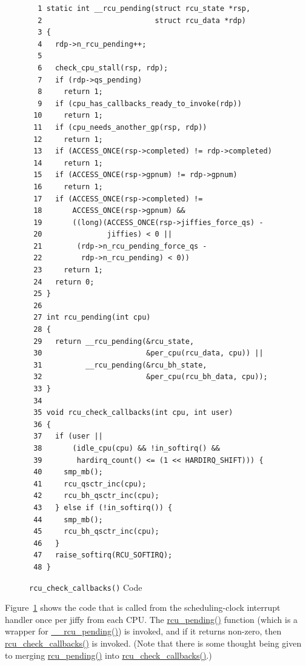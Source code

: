 \begin{figure}[tbp]
{ \scriptsize
\begin{verbatim}
  1 static int __rcu_pending(struct rcu_state *rsp,
  2                          struct rcu_data *rdp)
  3 {
  4   rdp->n_rcu_pending++;
  5 
  6   check_cpu_stall(rsp, rdp);
  7   if (rdp->qs_pending)
  8     return 1;
  9   if (cpu_has_callbacks_ready_to_invoke(rdp))
 10     return 1;
 11   if (cpu_needs_another_gp(rsp, rdp))
 12     return 1;
 13   if (ACCESS_ONCE(rsp->completed) != rdp->completed)
 14     return 1;
 15   if (ACCESS_ONCE(rsp->gpnum) != rdp->gpnum)
 16     return 1;
 17   if (ACCESS_ONCE(rsp->completed) !=
 18       ACCESS_ONCE(rsp->gpnum) &&
 19       ((long)(ACCESS_ONCE(rsp->jiffies_force_qs) -
 20               jiffies) < 0 ||
 21        (rdp->n_rcu_pending_force_qs -
 22         rdp->n_rcu_pending) < 0))
 23     return 1;
 24   return 0;
 25 }
 26 
 27 int rcu_pending(int cpu)
 28 {
 29   return __rcu_pending(&rcu_state,
 30                        &per_cpu(rcu_data, cpu)) ||
 31          __rcu_pending(&rcu_bh_state,
 32                        &per_cpu(rcu_bh_data, cpu));
 33 }
 34 
 35 void rcu_check_callbacks(int cpu, int user)
 36 {
 37   if (user ||
 38       (idle_cpu(cpu) && !in_softirq() &&
 39        hardirq_count() <= (1 << HARDIRQ_SHIFT))) {
 40     smp_mb();
 41     rcu_qsctr_inc(cpu);
 42     rcu_bh_qsctr_inc(cpu);
 43   } else if (!in_softirq()) {
 44     smp_mb();
 45     rcu_bh_qsctr_inc(cpu);
 46   }
 47   raise_softirq(RCU_SOFTIRQ);
 48 }
\end{verbatim}
}
\caption{{\tt rcu\_check\_callbacks()} Code}
\label{fig:app:rcuimpl:rcutreewt:Code for rcutree rcu-check-callbacks}
\end{figure}

Figure~\ref{fig:app:rcuimpl:rcutreewt:Code for rcutree rcu-check-callbacks}
shows the code that is called from the scheduling-clock interrupt
handler once per jiffy from each CPU.
The \url{rcu_pending()} function (which is a wrapper for \url{__rcu_pending()})
is invoked, and if it returns non-zero, then \url{rcu_check_callbacks()}
is invoked.
(Note that there is some thought being given to merging \url{rcu_pending()}
into \url{rcu_check_callbacks()}.)

